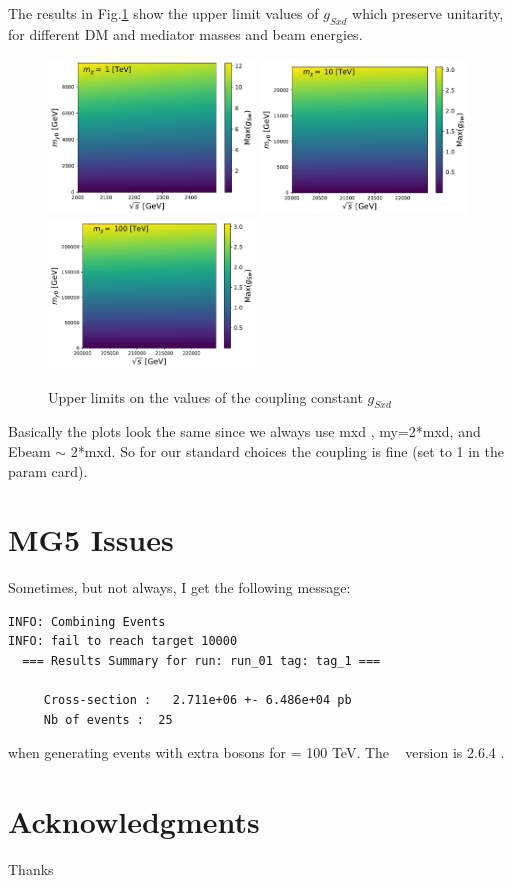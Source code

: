 \documentclass[epj,nopacs,fleqn]{svjour}
\begin{document}
The results in Fig.\ref{couplings} show the upper limit values of $g_{Sxd}$ which preserve unitarity, for different DM and mediator masses and beam energies.

\begin{figure}[!b]
	\centering
	\subfigure
	{ \includegraphics[width=0.49\textwidth]{Fig/COUPLINGS/coupling_constant_ul_Mxd_1000.pdf}}
	\subfigure
	{ \includegraphics[width=0.49\textwidth]{Fig/COUPLINGS/coupling_constant_ul_Mxd_10000.pdf}}
	\subfigure
	{ \includegraphics[width=0.49\textwidth]{Fig/COUPLINGS/coupling_constant_ul_Mxd_100000.pdf}}
	\caption{Upper limits on the values of the coupling constant  $g_{Sxd}$  }
	\label{couplings}
\end{figure}

Basically the plots look the same since we always use mxd , my=2*mxd, and Ebeam $\sim$ 2*mxd. So for our standard choices the coupling is fine (set to 1 in the param card).


\clearpage
\section{MG5 Issues}
Sometimes, but not always, I get the following message:
\begin{verbatim}
INFO: Combining Events 
INFO: fail to reach target 10000 
  === Results Summary for run: run_01 tag: tag_1 ===

     Cross-section :   2.711e+06 +- 6.486e+04 pb
     Nb of events :  25
\end{verbatim}
when generating events with extra bosons for \mchi = 100 TeV. The \MG~ version is 2.6.4 .
\clearpage



\section*{Acknowledgments}
Thanks
%


\end{document}
